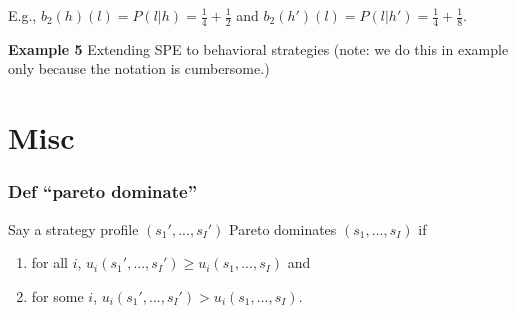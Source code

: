 \documentclass[
]{article}
\providecommand{\tightlist}{%
  \setlength{\itemsep}{0pt}\setlength{\parskip}{0pt}}
\begin{document}
E.g., \(b_2(h)(l) = P(l|h) = \frac{1}{4} + \frac{1}{2}\) and
\(b_2(h')(l) = P(l|h') = \frac{1}{4} + \frac{1}{8}\).

\textbf{Example 5} Extending SPE to behavioral strategies (note: we do
this in example only because the notation is cumbersome.)

\hypertarget{misc}{%
\section{Misc}\label{misc}}

\hypertarget{def-pareto-dominate}{%
\subsubsection{Def ``pareto dominate''}\label{def-pareto-dominate}}

Say a strategy profile \((s_1', ..., s_I')\) Pareto dominates
\((s_1, ..., s_I)\) if

\begin{enumerate}
\def\labelenumi{\arabic{enumi}.}
\tightlist
\item
  for all \(i\), \(u_i(s_1', ..., s_I') \geq u_i(s_1, ..., s_I)\) and
\item
  for some \(i\), \(u_i(s_1', ..., s_I') > u_i(s_1, ..., s_I)\).
\end{enumerate}
\end{document}
